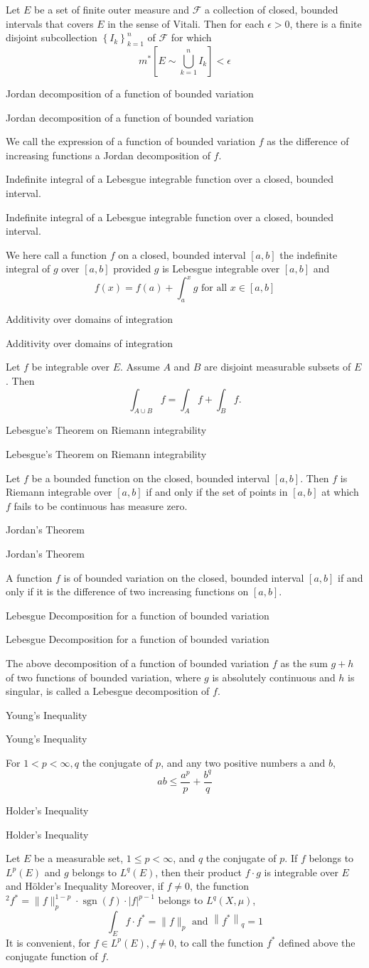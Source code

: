 \documentclass[17pt]{extarticle}
\newcommand{\boxset}[2]{\begin{mdframed}[style=darkQuesion]
#1
\end{mdframed}
\newpage
\begin{mdframed}[style=darkQuesion]
#1
  \end{mdframed}
\begin{mdframed}[style=darkAnswer]
#2
  \end{mdframed}
  \newpage
}
\begin{document}
{
Let $E$ be a set of finite outer measure and $\mathcal{F}$ a collection of closed, bounded intervals that covers $E$ in the sense of Vitali. Then for each $\epsilon>0$, there is a finite disjoint subcollection $\left\{I_{k}\right\}_{k=1}^{n}$ of $\mathcal{F}$ for which
\[
m^{*}\left[E \sim \bigcup_{k=1}^{n} I_{k}\right]<\epsilon
\]
}%
\boxset{Jordan decomposition of a function of bounded variation}
{
We call the expression of a function of bounded variation $f$ as the difference of increasing functions a Jordan decomposition of $f$.
}%
\boxset{Indefinite integral of a Lebesgue integrable function over a closed, bounded interval.}
{
We here call a function $f$ on a closed, bounded interval $[a, b]$ the indefinite integral of $g$ over $[a, b]$ provided $g$ is Lebesgue integrable over $[a, b]$ and
\[
f(x)=f(a)+\int_{a}^{x} g \text { for all } x \in[a, b]
\]
}%
\boxset{Additivity over domains of integration}
{
Let $f$ be integrable over $E$. Assume $A$ and $B$ are disjoint measurable subsets of $E$. Then
\[
\int_{A \cup B} f=\int_{A} f+\int_{B} f .
\]
}%
\boxset{Lebesgue's Theorem on Riemann integrability}
{
Let $f$ be a bounded function on the closed, bounded interval $[a, b]$. Then $f$ is Riemann integrable over $[a, b]$ if and only if the set of points in $[a, b]$ at which $f$ fails to be continuous has measure zero.
}%
\boxset{Jordan's Theorem}
{
A function $f$ is of bounded variation on the closed, bounded interval $[a, b]$ if and only if it is the difference of two increasing functions on $[a, b]$.
}%
\boxset{Lebesgue Decomposition for a function of bounded variation}
{
The above decomposition of a function of bounded variation $f$ as the sum $g+h$ of two functions of bounded variation, where $g$ is absolutely continuous and $h$ is singular, is called a Lebesgue decomposition of $f$.
}%
\boxset{Young's Inequality}
{
For $1<p<\infty, q$ the conjugate of $p$, and any two positive numbers a and $b$,
\[
a b \leq \frac{a^{p}}{p}+\frac{b^{q}}{q}
\]
}%
\boxset{Holder's Inequality}
{
Let $E$ be a measurable set, $1 \leq p<\infty$, and $q$ the conjugate of $p$. If $f$ belongs to $L^{p}(E)$ and $g$ belongs to $L^{q}(E)$, then their product $f \cdot g$ is integrable over $E$ and Hölder's Inequality
Moreover, if $f \neq 0$, the function ${ }^{2} f^{*}=\|f\|_{p}^{1-p} \cdot \operatorname{sgn}(f) \cdot|f|^{p-1}$ belongs to $L^{q}(X, \mu)$,
\[
\int_{E} f \cdot f^{*}=\|f\|_{p} \text { and }\left\|f^{*}\right\|_{q}=1
\]
It is convenient, for $f \in L^{p}(E), f \neq 0$, to call the function $f^{*}$ defined above the conjugate function of $f$.
}%
\end{document}
